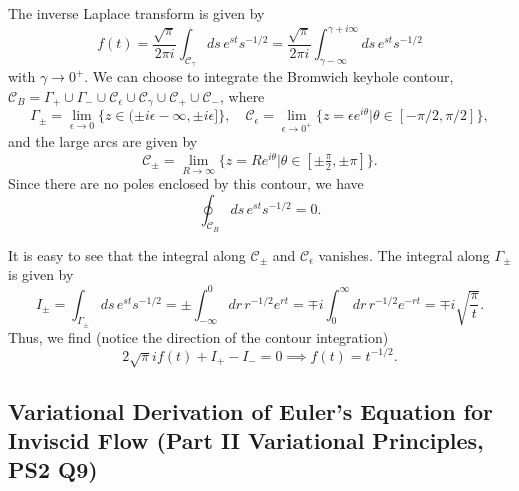 The inverse Laplace transform is given by
\begin{equation}
    f(t) = \frac{\sqrt{\pi}}{2\pi i}\int_{\mathcal{C}_\gamma}ds\,e^{st}s^{-1/2}= \frac{\sqrt{\pi}}{2\pi i}\int^{\gamma+i\infty}_{\gamma-\infty}ds\,e^{st}s^{-1/2}
\end{equation}
with $\gamma\to 0^+$. We can choose to integrate the Bromwich keyhole contour, $\mathcal{C}_B = \Gamma_+ \cup \Gamma_- \cup \mathcal{C}_\epsilon \cup \mathcal{C}_\gamma \cup \mathcal{C}_+\cup \mathcal{C}_-$, where
\begin{equation}
    \Gamma_\pm = \lim_{\epsilon\to 0}\{z\in(\pm i \epsilon -\infty, \pm i \epsilon]\}, \quad\mathcal{C}_\epsilon = \lim_{\epsilon\to0^+}\{z=\epsilon e^{i\theta}|\theta\in[-\pi/2, \pi/2]\},
\end{equation}
and the large arcs are given by
\begin{equation}
\mathcal{C}_\pm = \lim_{R\to\infty} \{ z = R e^{i\theta} | \theta \in [\pm \tfrac{\pi}{2}, \pm \pi] \}.
\end{equation} 
Since there are no poles enclosed by this contour, we have
\begin{equation}
    \oint_{\mathcal{C}_B}ds\,e^{st}s^{-1/2} = 0.
\end{equation}

It is easy to see that the integral along $\mathcal{C}_\pm$ and $\mathcal{C}_\epsilon$ vanishes. The integral along $\Gamma_\pm$ is given by
\begin{equation}
    I_\pm = \int_{\Gamma_\pm}ds\,e^{st}s^{-1/2} = \pm\int^0_{-\infty}dr\, r^{-1/2}e^{rt} = \mp i\int^\infty_0dr\,r^{-1/2}e^{-rt} = \mp i\sqrt{\frac{\pi}{t}}.
\end{equation}
Thus, we find (notice the direction of the contour integration)
\begin{equation}
    2\sqrt{\pi}if(t) +I_+ - I_- = 0 \implies f(t) = t^{-1/2}.
\end{equation}

\subsection{Variational Derivation of Euler's Equation for Inviscid Flow (Part II Variational Principles, PS2 Q9)}
\label{sec:euler-fluid}

